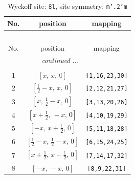 \documentclass[fleqn,8pt]{jsarticle}
\begin{document}
\begin{longtable}{ccc}
\caption{Wyckoff site: {\tt 8l}, site symmetry: {\tt m'.2'm}}
 \\
 \hline \hline
No. & position & mapping \\ \hline \endfirsthead

\multicolumn{2}{l}{\tablename\ \thetable{}} \\
 \hline \hline
No. & position & mapping \\ \hline \endhead

 \hline \hline
\multicolumn{2}{r}{\footnotesize\it continued ...} \\ \endfoot

 \hline \hline
\multicolumn{2}{r}{} \\ \endlastfoot

1 & $\left[ x,\, x,\, 0 \right]$ & {\tt [1,16,23,30]} \\ \hline
2 & $\left[ \frac{1}{2} - x,\, x,\, 0 \right]$ & {\tt [2,12,21,27]} \\ \hline
3 & $\left[ x,\, \frac{1}{2} - x,\, 0 \right]$ & {\tt [3,13,20,26]} \\ \hline
4 & $\left[ x + \frac{1}{2},\, - x,\, 0 \right]$ & {\tt [4,10,19,29]} \\ \hline
5 & $\left[ - x,\, x + \frac{1}{2},\, 0 \right]$ & {\tt [5,11,18,28]} \\ \hline
6 & $\left[ \frac{1}{2} - x,\, \frac{1}{2} - x,\, 0 \right]$ & {\tt [6,15,24,25]} \\ \hline
7 & $\left[ x + \frac{1}{2},\, x + \frac{1}{2},\, 0 \right]$ & {\tt [7,14,17,32]} \\ \hline
8 & $\left[ - x,\, - x,\, 0 \right]$ & {\tt [8,9,22,31]} \\
\end{longtable}
\renewcommand{\arraystretch}{1.2}
\end{document}
